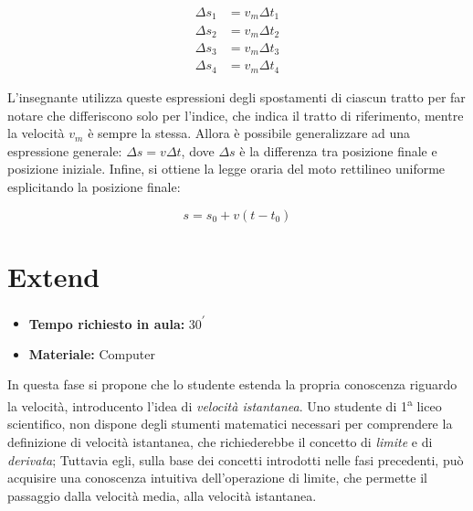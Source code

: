 \documentclass{report} \usepackage[T1]{fontenc} \usepackage[italian]{babel}
\begin{document}
\begin{align}
\Delta s_1 &= v_m \Delta t_1 \\
\Delta s_2 &= v_m \Delta t_2 \\
\Delta s_3 &= v_m \Delta t_3 \\
\Delta s_4 &= v_m \Delta t_4
\end{align}

L’insegnante utilizza queste espressioni degli spostamenti di ciascun tratto
per far notare che differiscono solo per l’indice, che indica il tratto di
riferimento, mentre la velocità $v_m$ è sempre la stessa. Allora è possibile
generalizzare ad una espressione generale: $\Delta s= v \Delta t$, dove $\Delta s$
è la differenza tra posizione finale e posizione iniziale.
Infine, si ottiene la legge oraria del moto rettilineo uniforme esplicitando la
posizione finale:

\begin{equation}
s = s_0 + v (t - t_0)
\end{equation}

\pagebreak

\section{Extend}

\begin{itemize}
\item \textbf{Tempo richiesto in aula:} 30\textsuperscript{$\prime$}
\item \textbf{Materiale:} Computer
\end{itemize}

In questa fase si propone che lo studente estenda la propria conoscenza
riguardo la velocità, introducento l'idea di \emph{velocità istantanea}.
Uno studente di 1\textsuperscript{a} liceo scientifico, non dispone
degli stumenti matematici necessari per comprendere la definizione
di velocità istantanea, che richiederebbe il concetto
di \emph{limite} e di \emph{derivata}; Tuttavia egli, sulla base
dei concetti introdotti nelle fasi precedenti, può acquisire
una conoscenza intuitiva dell'operazione di limite, che permette
il passaggio dalla velocità media, alla velocità istantanea.
\end{document}
